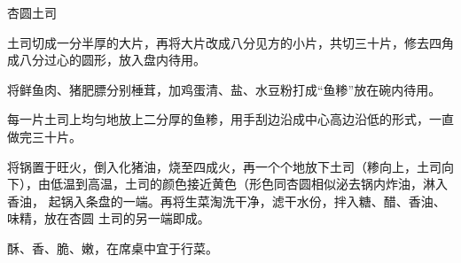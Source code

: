 \begin{recipe}{杏圆土司}

\ingredients


\preparation

\step 土司切成一分半厚的大片，再将大片改成八分见方的小片，共切三十片，修去四角
成八分过心的圆形，放入盘内待用。

\step 将鲜鱼肉、猪肥膘分别棰茸，加鸡蛋清、盐、水豆粉打成“鱼糁”放在碗内待用。

\step 每一片土司上均匀地放上二分厚的鱼糁，用手刮边沿成中心高边沿低的形式，一直
做完三十片。

\step 将锅置于旺火，倒入化猪油，烧至四成火，再一个个地放下土司（糁向上，土司向
下），由低温到高温，土司的颜色接近黄色（形色同杏圆相似泌去锅内炸油，淋入香油，
起锅入条盘的一端。再将生菜淘洗干净，滤干水份，拌入糖、醋、香油、味精，放在杏圆
土司的另一端即成。

\features

酥、香、脆、嫩，在席桌中宜于行菜。

\end{recipe}

